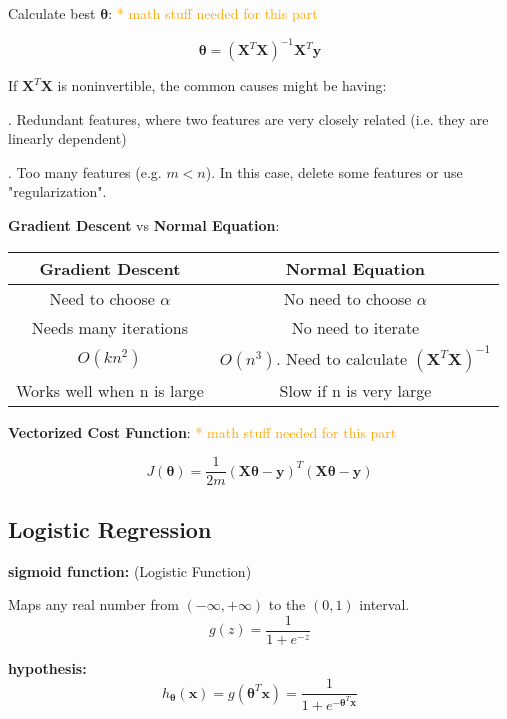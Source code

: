 \documentclass{article}
\begin{document}
\noindent Calculate best \(\boldsymbol{\theta}\): \textcolor{orange}{ * math stuff needed for this part}

\[
\boldsymbol{\theta} = (\textbf{X}^T\textbf{X})^{-1}\textbf{X}^T\textbf{y}
\]

\noindent If \(\textbf{X}^T\textbf{X}\) is noninvertible, the common causes might be having:

. Redundant features, where two features are very closely related (i.e. they are linearly dependent)

. Too many features (e.g. \(m < n\)). In this case, delete some features or use "regularization".

\bigskip

\noindent \textbf{Gradient Descent} vs \textbf{Normal Equation}:

\begin{center}
\begin{tabular}{ | c | c | } 
\hline
\textbf{Gradient Descent} & \textbf{Normal Equation} \\ 
\hline
Need to choose \(\alpha\) & No need to choose \(\alpha\) \\ 
\hline
Needs many iterations & No need to iterate \\ 
\hline
\(O(kn^2)\) & \(O(n^3)\). Need to calculate \((\textbf{X}^T\textbf{X})^{-1}\) \\ 
\hline
Works well when n is large & Slow if n is very large \\ 
\hline
\end{tabular}
\end{center}

\noindent \textbf{Vectorized Cost Function}: \textcolor{orange}{ * math stuff needed for this part}

\[J(\boldsymbol{\theta}) = \frac{1}{2m} (\textbf{X}\boldsymbol{\theta} - \textbf{y})^T(\textbf{X}\boldsymbol{\theta} - \textbf{y})\]

\subsection{Logistic Regression}

\noindent \textbf{sigmoid function:} (Logistic Function)

\noindent Maps any real number from \((-\infty, +\infty)\) to the \((0, 1)\) interval.
\[g(z) = \frac{1}{1 + e^{-z}}\]

\noindent \textbf{hypothesis:}
\[
h_{\boldsymbol{\theta}}(\textbf{x}) 
= g(\boldsymbol{\theta}^T \textbf{x})
= \frac{1}{1 + e^{-\boldsymbol{\theta}^T \textbf{x}}}
\]
\end{document}
